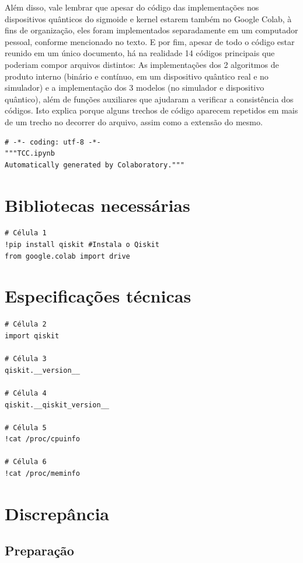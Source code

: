 Além disso, vale lembrar que apesar do código das implementações nos dispositivos quânticos do sigmoide e kernel estarem também no Google Colab, à fins de organização, eles foram implementados separadamente em um computador pessoal, conforme mencionado no texto. E por fim, apesar de todo o código estar reunido em um único documento, há na realidade 14 códigos principais que poderiam compor arquivos distintos: As implementações dos  2 algoritmos de produto interno (binário e contínuo, em um dispositivo quântico real e no simulador)  e a implementação dos 3 modelos (no simulador e dispositivo quântico), além de funções auxiliares que ajudaram a verificar a consistência dos códigos. Isto explica porque alguns trechos de código aparecem repetidos em mais de um trecho no decorrer do arquivo, assim como a extensão do mesmo.

\begin{verbatim}
# -*- coding: utf-8 -*-
"""TCC.ipynb
Automatically generated by Colaboratory."""
\end{verbatim}

\section{Bibliotecas necessárias}

\begin{verbatim}
# Célula 1
!pip install qiskit #Instala o Qiskit
from google.colab import drive
\end{verbatim}

\section{Especificações técnicas}

\begin{verbatim}
# Célula 2
import qiskit

# Célula 3
qiskit.__version__

# Célula 4
qiskit.__qiskit_version__

# Célula 5
!cat /proc/cpuinfo

# Célula 6
!cat /proc/meminfo
\end{verbatim}

\section{Discrepância}
\subsection{Preparação}

